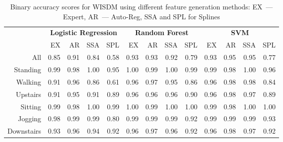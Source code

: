 \documentclass{llncs}
\begin{document}
\begin{table}[!h]
	\centering
	\caption{Binary accuracy scores for WISDM using different feature generation methods: EX~--- Expert, AR~--- Auto-Reg, SSA and  SPL for Splines}
	\footnotesize
	\begin{tabular}{r|rrrr|rrrr|rrrr|}
		& \multicolumn{4}{c|}{\textbf{Logistic Regression}} & \multicolumn{4}{c|}{\textbf{Random Forest}} & \multicolumn{4}{c|}{\textbf{SVM}}          \\ \cline{2-13} 
		& EX   & AR   & SSA   & SPL  & EX  & AR & SSA & SPL & EX & AR & SSA & SPL \\ \hline
		All& 0.85 & 0.91 & 0.84 & 0.58 & 0.93 & 0.93 & 0.92 & 0.79 & 0.93 & 0.95 & 0.95 & 0.77 \\
		Standing& 0.99 & 0.98 & 1.00 & 0.95 & 1.00 & 0.99 & 1.00 & 0.99 & 0.99 & 0.98 & 1.00 & 0.96 \\
		Walking& 0.91 & 0.96 & 0.86 & 0.61 & 0.96 & 0.97 & 0.95 & 0.86 & 0.96 & 0.98 & 0.98 & 0.84 \\
		Upstairs& 0.91 & 0.95 & 0.91 & 0.89 & 0.96 & 0.96 & 0.96 & 0.90 & 0.96 & 0.98 & 0.97 & 0.89 \\
		Sitting& 0.99 & 0.98 & 1.00 & 0.99 & 1.00 & 0.99 & 1.00 & 1.00 & 0.99 & 0.98 & 1.00 & 1.00 \\
		Jogging& 0.98 & 0.99 & 0.99 & 0.80 & 0.99 & 0.99 & 0.99 & 0.92 & 0.99 & 0.99 & 0.99 & 0.93 \\
		Downstairs& 0.93 & 0.96 & 0.94 & 0.92 & 0.96 & 0.97 & 0.96 & 0.92 & 0.96 & 0.98 & 0.97 & 0.92 \\ \hline
	\end{tabular}
	\label{tbl::wisdm_methods_results}
\end{table}
\end{document}
